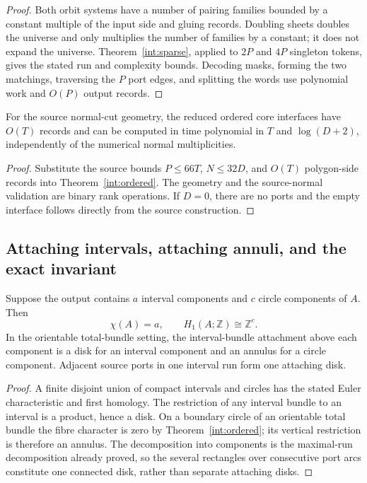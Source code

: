 \begin{proof}
Both orbit systems have a number of pairing families bounded by a constant
multiple of the input side and gluing records.  Doubling sheets doubles
the universe and only multiplies the number of families by a constant; it
does not expand the universe.  Theorem~\ref{int:sparse}, applied to $2P$
and $4P$ singleton tokens, gives the stated run and complexity bounds.
Decoding masks, forming the two matchings, traversing the $P$ port edges,
and splitting the words use polynomial work and $O(P)$ output records.
\end{proof}

\begin{corollary}
\label{int:normal}
For the source normal-cut geometry, the reduced ordered core interfaces have
$O(T)$ records and can be computed in time polynomial in $T$ and
$\log(D+2)$, independently of the numerical normal multiplicities.
\end{corollary}

\begin{proof}
Substitute the source bounds $P\le66T$, $N\le32D$, and $O(T)$ polygon-side
records into Theorem~\ref{int:ordered}.  The geometry and the source-normal
validation are binary rank operations.  If $D=0$, there are no ports and the
empty interface follows directly from the source construction.
\end{proof}

\subsection{Attaching intervals, attaching annuli, and the exact invariant}
\label{int:attachments}

\begin{corollary}
\label{int:attachment-types}
Suppose the output contains $a$ interval components and $c$ circle components
of $A$.  Then
\[
                \chi(A)=a,\qquad
                H_1(A;\mathbb Z)\cong\mathbb Z^c.
\]
In the orientable total-bundle setting, the interval-bundle attachment above
each component is a disk for an interval component and an annulus for a
circle component.  Adjacent source ports in one interval run form one
attaching disk.
\end{corollary}

\begin{proof}
A finite disjoint union of compact intervals and circles has the stated
Euler characteristic and first homology.  The restriction of any interval
bundle to an interval is a product, hence a disk.  On a boundary circle of
an orientable total bundle the fibre character is zero by
Theorem~\ref{int:ordered}; its vertical restriction is therefore an annulus.
The decomposition into components is the maximal-run decomposition already
proved, so the several rectangles over consecutive port arcs constitute
one connected disk, rather than separate attaching disks.
\end{proof}

